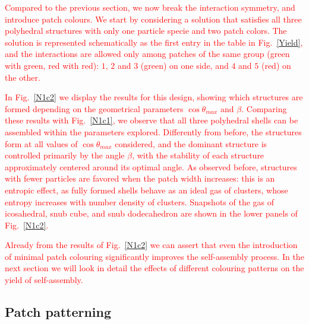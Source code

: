 \documentclass[a4paper, amsfonts, amssymb, amsmath, reprint, showkeys, nofootinbib, twoside]{revtex4-1}
\begin{document}
\textcolor{red}{Compared to the previous section, we now break the interaction symmetry, and introduce patch colours.
We start by considering a solution that satisfies all three polyhedral structures with only one particle specie and two patch colors.
The solution is represented schematically as the first entry in the table in Fig.~\ref{Yield}, and the interactions are allowed only among patches of the same group (green with green, red with red): $1$, $2$ and $3$ (green) on one side, and $4$ and $5$ (red) on the other.}

\textcolor{red}{In Fig.~\ref{N1c2} we display the results for this design, showing which structures are formed depending on the geometrical parameters  $\cos\theta_{max}$ and $\beta$. Comparing these results with Fig.~\ref{N1c1}, we observe that all three polyhedral shells can be assembled within the parameters explored. Differently from before, the structures form at all values of $\cos\theta_{max}$ considered, and the dominant structure is controlled primarily by the angle $\beta$, with the stability of each structure approximately centered around its optimal angle. As observed before, structures with fewer particles are favored when the patch width increases: this is an entropic effect, as fully formed shells behave as an ideal gas of clusters, whose entropy increases with number density of clusters. Snapshots of the gas of icosahedral, snub cube, and snub dodecahedron are shown in the lower panels of Fig.~\ref{N1c2}.}

\textcolor{red}{Already from the results of Fig.~\ref{N1c2} we can assert that even the introduction of minimal patch colouring significantly improves the self-assembly process. In the next section we will look in detail the effects of different colouring patterns on the yield of self-assembly.}


\subsection{Patch patterning}
\end{document}
